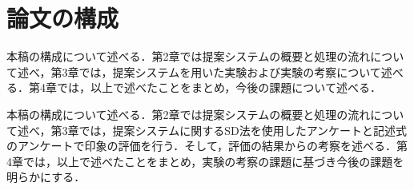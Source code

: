\section{論文の構成}
本稿の構成について述べる．第2章では提案システムの概要と処理の流れについて述べ，第3章では，提案システムを用いた実験および実験の考察について述べる．第4章では，以上で述べたことをまとめ，今後の課題について述べる．

本稿の構成について述べる．第2章では提案システムの概要と処理の流れについて述べ，第3章では，提案システムに関するSD法を使用したアンケートと記述式のアンケートで印象の評価を行う．そして，評価の結果からの考察を述べる．第4章では，以上で述べたことをまとめ，実験の考察の課題に基づき今後の課題を明らかにする．
\fi

